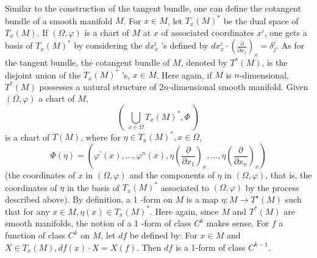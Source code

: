 \documentclass[12pt,hyperref,a4paper,UTF8]{ctexart}
\begin{document}
\vskip 3pt
Similar to the construction of the tangent bundle, one can define the cotangent bundle of a smooth manifold $M$. For $x \in M$, let $T_{{x}}(M)^*$ be the dual space of $T_x(M)$. If $(\Omega, \varphi)$ is a chart of $M$ at $x$ of associated coordinates $x^i$, one gets a basis of $T_x(M)^*$ by considering the $d x_{{x}}^i$ 's defined by $d x_{{x}}^i \cdot\left(\frac{\partial}{\partial {x}_j}\right)_x=\delta_j^i$. As for the tangent bundle, the cotangent bundle of $M$, denoted by $T^*(M)$, is the disjoint union of the $T_x(M)^*$ 's, $x \in M$. Here again, if $M$ is $n$-dimensional, $T^*(M)$ possesses a natural structure of $2 n$-dimensional smooth manifold. Given $(\Omega, \varphi)$ a chart of $M$,
$$
\left(\;\bigcup_{x \in \Omega} T_x(M)^*, \Phi\;\right)
$$
is a chart of $T(M)$, where for $\eta \in T_x(M)^*, x \in \Omega$,
$$
\Phi(\eta)=\left(\varphi^{\prime}(x), \ldots, \varphi^n(x), \eta\left(\frac{\partial}{\partial x_1}\right)_x, \ldots, \eta\left(\frac{\partial}{\partial x_n}\right)_x\right)
$$
(the coordinates of $x$ in $(\Omega, \varphi)$ and the components of $\eta$ in $(\Omega, \varphi)$, that is, the coordinates of $\eta$ in the basis of $T_x(M)^*$ associated to $(\Omega, \varphi)$ by the process described
above). By definition, a 1 -form on $M$ is a map $\eta: M \rightarrow T^{\star}(M)$ such that for any $x \in M, \eta(x) \in T_x(M)^*$. Here again, since $M$ and $T^*(M)$ are smooth manifolds, the notion of a 1 -form of class $C^k$ makes sense. For $f$ a function of class $C^k$ on $M$, let $d f$ be defined by: For $x \in M$ and $X \in T_x(M), d f(x) \cdot X=X(f)$. Then $d f$ is a 1-form of class $C^{k-1}$.
\end{document}
